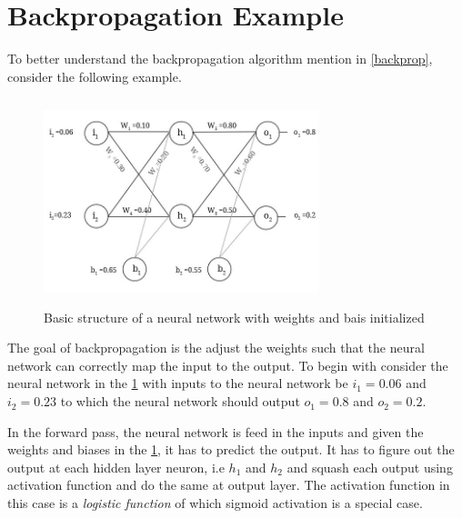 \label{ch:appedix}
\section{Backpropagation Example}\label{appendix:BackpropExample}

To better understand the backpropagation algorithm mention in \ref{backprop}, consider the following example.

\begin{figure}[!ht]
    \centering
    \includegraphics[width=8cm,height=6cm, keepaspectratio]{pics/BackpropExample.jpg}
    \captionsetup{justification=justified,margin=1cm}
    \caption{Basic structure of a neural network with weights and bais initialized}
    \label{fig:bakprop}
\end{figure}

The goal of backpropagation is the adjust the weights such that the neural network can correctly map the input to the output. To begin with consider the neural network in the \ref{fig:bakprop} with inputs to the neural network be $i_{1} = 0.06$ and $i_{2} = 0.23$ to which the neural network should output $o_{1}=0.8$ and $o_{2}=0.2$.

In the forward pass, the neural network is feed in the inputs and given the weights and biases in the \ref{fig:bakprop}, it has to predict the output. It has to figure out the output at each hidden layer neuron, i.e $h_{1}$ and $h_{2}$ and squash each output using activation function and do the same at output layer. The activation function in this case is a \textit{logistic function} of which sigmoid activation is a special case.

